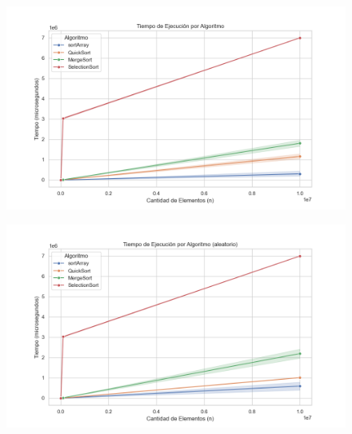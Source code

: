 \begin{figure}[H]
    \centering
    \begin{minipage}[t]{1\textwidth}
        \includegraphics[width=\textwidth]{../code/sorting/data/plots/tiempo_vs_algoritmo.png}
     \end{minipage}%
    \caption{}
    \label{fig:scatterplot_3}
\end{figure}

\begin{figure}[H]
    \centering
    \begin{minipage}[t]{1\textwidth}
        \includegraphics[width=\textwidth]{../code/sorting/data/plots/tiempo_vs_algoritmo_aleatorio.png}
     \end{minipage}%
    \caption{}
    \label{fig:scatterplot_3}
\end{figure}

